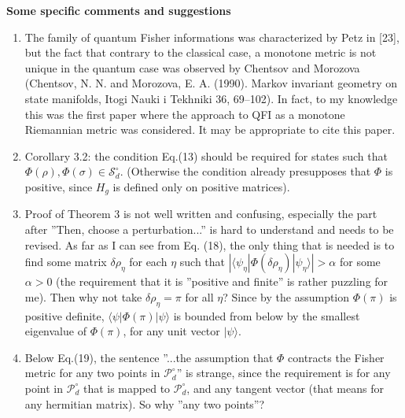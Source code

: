\documentclass[12pt]{article}
\begin{document}
\medskip
 

\medskip

\noindent
\textbf{Some specific comments and suggestions}

\begin{enumerate}
\item The family of quantum Fisher informations was characterized by Petz in [23], but the
fact that contrary to the classical case, a monotone metric is not unique in the
quantum case was observed  by Chentsov and Morozova (Chentsov, N. N. and Morozova, E. A.
(1990). Markov invariant geometry on state manifolds, Itogi Nauki i Tekhniki 36, 69–102).
In fact, to my knowledge this was the first paper where the approach to QFI as a monotone
Riemannian metric was considered. It may be appropriate to cite this paper. 

\item Corollary 3.2: the condition  Eq.(13) should be required for states such that
$\Phi(\rho),\Phi(\sigma)\in \mathcal S^\circ_d$. (Otherwise the condition already
presupposes that $\Phi$ is positive, since $H_g$ is defined only on positive matrices).

\item Proof of Theorem 3 is not well written and confusing, especially the part after
''Then, choose a
perturbation...'' is hard to understand and needs to be revised. As far as I can see from Eq. (18), the only
thing that is needed is to find some matrix $\delta\rho_\eta$ for each $\eta$ such that
$|\langle\psi_\eta|\Phi(\delta\rho_\eta)|\psi_\eta\rangle|> \alpha$ for some $\alpha>0$ (the
requirement that it is ''positive and finite'' is rather puzzling for me). Then why not
take $\delta\rho_\eta=\pi$ for all $\eta$? Since by the assumption $\Phi(\pi)$ is positive
definite, $\langle \psi|\Phi(\pi)|\psi\rangle$ is bounded from below by the smallest
eigenvalue of $\Phi(\pi)$, for any unit vector $|\psi\rangle$. 

\item Below Eq.(19), the sentence ''...the assumption that $\Phi$ contracts the
Fisher metric for any two points in $\mathcal P^\circ_d$'' is strange, since the
requirement is for any point in $\mathcal P^\circ_d$ that is mapped to $\mathcal
P^\circ_d$, and any tangent vector (that means for any hermitian matrix). So why ''any two
points''?



\end{enumerate}
\end{document}
